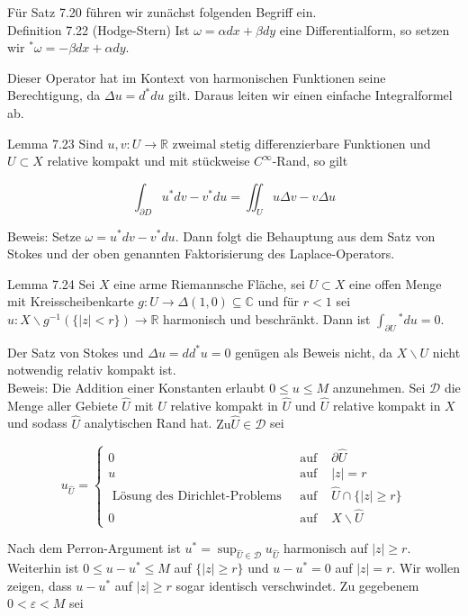 \documentclass[10pt, letterpaper]{article}
\begin{document}
Für Satz 7.20 führen wir zunächst folgenden Begriff ein.\\
Definition 7.22 (Hodge-Stern) Ist $\omega=\alpha d x+\beta d y$ eine Differentialform, so setzen wir $^{*} \omega=-\beta d x+\alpha d y$.

Dieser Operator hat im Kontext von harmonischen Funktionen seine Berechtigung, da $\Delta u=d^{*} d u$ gilt. Daraus leiten wir einen einfache Integralformel ab.

Lemma 7.23 Sind $u, v: U \longrightarrow \mathbb{R}$ zweimal stetig differenzierbare Funktionen und $U \subset X$ relative kompakt und mit stückweise $C^{\infty}$-Rand, so gilt

$$
\int_{\partial D} u^{*} d v-v^{*} d u=\iint_{U} u \Delta v-v \Delta u
$$

Beweis: Setze $\omega=u^{*} d v-v^{*} d u$. Dann folgt die Behauptung aus dem Satz von Stokes und der oben genannten Faktorisierung des Laplace-Operators.

Lemma 7.24 Sei $X$ eine arme Riemannsche Fläche, sei $U \subset X$ eine offen Menge mit Kreisscheibenkarte $g: U \rightarrow \Delta(1,0) \subseteq \mathbb{C}$ und für $r<1$ sei $u: X \backslash g^{-1}(\{|z|<r\}) \rightarrow \mathbb{R}$ harmonisch und beschränkt. Dann ist $\int_{\partial U}{ }^{*} d u=0$.

Der Satz von Stokes und $\Delta u=d d^{*} u=0$ genügen als Beweis nicht, da $X \backslash U$ nicht notwendig relativ kompakt ist.\\
Beweis: Die Addition einer Konstanten erlaubt $0 \leq u \leq M$ anzunehmen. Sei $\mathcal{D}$ die Menge aller Gebiete $\hat{U}$ mit $U$ relative kompakt in $\hat{U}$ und $\hat{U}$ relative kompakt in $X$ und sodass $\hat{U}$ analytischen Rand hat. $\mathrm{Zu} \hat{U} \in \mathcal{D}$ sei

$$
u_{\hat{U}}=\left\{\begin{array}{rcl}
0 & \text { auf } & \partial \hat{U} \\
u & \text { auf } & |z|=r \\
\text { Lösung des Dirichlet-Problems } & \text { auf } & \hat{U} \cap\{|z| \geqslant r\} \\
0 & \text { auf } & X \backslash \hat{U}
\end{array}\right.
$$

Nach dem Perron-Argument ist $u^{*}=\sup _{\hat{U} \in \mathcal{D}} u_{\hat{U}}$ harmonisch auf $|z| \geqslant r$. Weiterhin ist $0 \leq u-u^{*} \leq M$ auf $\{|z| \geqslant r\}$ und $u-u^{*}=0$ auf $|z|=r$. Wir wollen zeigen, dass $u-u^{*}$ auf $|z| \geqslant r$ sogar identisch verschwindet. Zu gegebenem $0<\varepsilon<M$ sei
\end{document}

